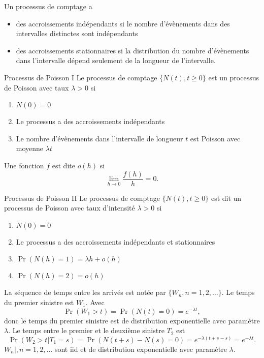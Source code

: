 Un processus de comptage a
\begin{itemize}
	\item des accroissements indépendants si le nombre d'évènements dans des intervalles distinctes sont indépendants
	\item des accroissements stationnaires si la distribution du nombre d'évènements dans l'intervalle dépend seulement de la longueur de l'intervalle. 
\end{itemize}

\begin{definition}{Processus de Poisson I}{}
	Le processus de comptage $\{N(t), t \geq 0\}$ est un processus de Poisson avec taux $\lambda > 0$ si
	\begin{enumerate}
		\item $N(0) = 0$
		\item Le processus a des accroissements indépendants
		\item Le nombre d'évènements dans l'intervalle de longueur $t$ est Poisson avec moyenne $\lambda t$
	\end{enumerate}
\end{definition}

\begin{definition}{}{}
	Une fonction $f$ est dite $o(h)$ si 
	$$\lim\limits_{h\to 0} \frac{f(h)}{h} = 0.$$
\end{definition}

\begin{definition}{Processus de Poisson II}{}
	Le processus de comptage $\{N(t), t\geq 0\}$ est dit un processus de Poisson avec taux d'intensité $\lambda > 0$ si
	\begin{enumerate}
		\item $N(0) = 0$
		\item Le processus a des accroissements indépendants et stationnaires
		\item $\Pr(N(h) = 1) = \lambda h + o(h)$
		\item $\Pr(N(h) = 2) = o(h)$
	\end{enumerate}
\end{definition}

\begin{definition}{}{}
	La séquence de temps entre les arrivés est notée par $\{W_n, n = 1, 2, \dots\}$. Le temps du premier sinistre est $W_1$. Avec 
	$$\Pr(W_1 > t) = \Pr(N(t) = 0) = e^{-\lambda t},$$
	donc le temps du premier sinistre est de distribution exponentielle avec paramètre $\lambda$. Le temps entre le premier et le deuxième sinistre $T_2$ est 
	$$\Pr(W_2 > t \vert T_1 = s) = \Pr(N(t + s) - N(s) = 0) = e^{-\lambda (t + s - s)} = e^{-\lambda t}.$$
	\tcblower
	$W_n\vert, n = 1, 2, \dots$ sont iid et de distribution exponentielle avec paramètre $\lambda$. 
\end{definition}

